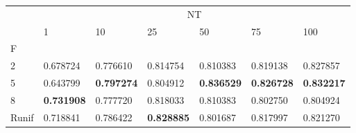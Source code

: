 \begin{table}[htbp]
\centering
\label{heart-results}
\begin{tabular}{lllllll}
\toprule
 & \multicolumn{6}{c}{NT} \\
 & 1 & 10 & 25 & 50 & 75 & 100 \\
F &  &  &  &  &  &  \\
\midrule
2 & 0.678724 & 0.776610 & 0.814754 & 0.810383 & 0.819138 & 0.827857 \\
5 & 0.643799 & \textbf{0.797274} & 0.804912 & \textbf{0.836529} & \textbf{0.826728} & \textbf{0.832217} \\
8 & \textbf{0.731908} & 0.777720 & 0.818033 & 0.810383 & 0.802750 & 0.804924 \\
Runif & 0.718841 & 0.786422 & \textbf{0.828885} & 0.801687 & 0.817997 & 0.821270 \\
\bottomrule
\end{tabular}
\end{table}
